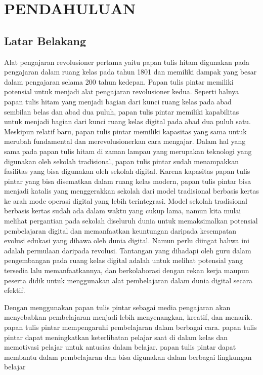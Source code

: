 \chapter{PENDAHULUAN}
\label{chap:pendahuluan}


\section{Latar Belakang}
\label{sec:latarbelakang}

Alat pengajaran revolusioner pertama yaitu papan tulis hitam digunakan pada pengajaran dalam ruang kelas pada tahun 1801 dan memiliki dampak yang besar dalam pengajaran selama 200 tahun kedepan. Papan tulis pintar memiliki potensial untuk menjadi alat pengajaran revolusioner kedua. Seperti halnya papan tulis hitam yang menjadi bagian dari kunci ruang kelas pada abad sembilan belas dan abad dua puluh, papan tulis pintar memiliki kapabilitas untuk menjadi bagian dari kunci ruang kelas digital pada abad dua puluh satu. Meskipun relatif baru, papan tulis pintar memiliki kapasitas yang sama untuk merubah fundamental dan merevolusionerkan cara mengajar.
Dalam hal yang sama pada papan tulis hitam di zaman lampau yang merupakan teknologi yang digunakan oleh sekolah tradisional, papan tulis pintar sudah menampakkan fasilitas yang bisa digunakan oleh sekolah digital. Karena kapasitas papan tulis pintar yang bisa disematkan dalam ruang kelas modern, papan tulis pintar bisa menjadi katalis yang menggerakkan sekolah dari model tradisional berbasis kertas ke arah mode operasi digital yang lebih terintegrasi. Model sekolah tradisional berbasis kertas sudah ada dalam waktu yang cukup lama, namun kita mulai melihat pergantian pada sekolah diseluruh dunia untuk memaksimalkan potensial pembelajaran digital dan memanfaatkan keuntungan daripada kesempatan evolusi edukasi yang dibawa oleh dunia digital.
Namun perlu diingat bahwa ini adalah permulaan daripada revolusi. Tantangan yang dihadapi oleh guru dalam pengembangan pada ruang kelas digital adalah untuk melihat potensial yang tersedia lalu memanfaatkannya, dan berkolaborasi dengan rekan kerja maupun peserta didik untuk menggunakan alat pembelajaran dalam dunia digital secara efektif.  \citep{Lant2016}

Dengan menggunakan papan tulis pintar sebagai media pengajaran akan menyebabkan pembelajaran menjadi lebih menyenangkan, kreatif, dan menarik. papan tulis pintar mempengaruhi pembelajaran dalam berbagai cara. papan tulis pintar dapat meningkatkan keterlibatan pelajar saat di dalam kelas dan memotivasi pelajar untuk antusias dalam belajar. papan tulis pintar dapat membantu dalam pembelajaran dan bisa digunakan dalam berbagai lingkungan belajar \citep{jelyani_janfaza_soori_2014}

